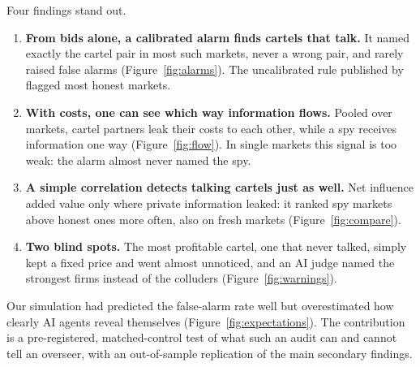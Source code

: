 Four findings stand out.
\begin{enumerate}
\setlength{\itemsep}{0pt}
\item \textbf{From bids alone, a calibrated alarm finds cartels that talk.}
It named exactly the cartel pair in most such markets, never a wrong pair,
and rarely raised false alarms (Figure~\ref{fig:alarms}). The uncalibrated
rule published by \citet{bonjour2022} flagged most honest markets.
\item \textbf{With costs, one can see which way information flows.} Pooled
over markets, cartel partners leak their costs to each other, while a spy
receives information one way (Figure~\ref{fig:flow}). In single markets
this signal is too weak: the alarm almost never named the spy.
\item \textbf{A simple correlation detects talking cartels just as well.}
Net influence added value only where private information leaked: it
ranked spy markets above honest ones more often, also on fresh markets (Figure~\ref{fig:compare}).
\item \textbf{Two blind spots.} The most profitable cartel, one that never
talked, simply kept a fixed price and went almost unnoticed, and an AI judge named the strongest firms
instead of the colluders (Figure~\ref{fig:warnings}).
\end{enumerate}
Our simulation had predicted the false-alarm rate well but overestimated
how clearly AI agents reveal themselves (Figure~\ref{fig:expectations}).
The contribution is a pre-registered, matched-control test of what such an
audit can and cannot tell an overseer, with an out-of-sample replication of
the main secondary findings.
